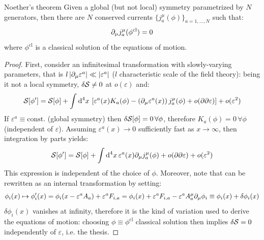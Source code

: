 \begin{theorem}{Noether's theorem}{}
  Given a global (but not local) symmetry parametrized by $ N $ generators, then there are $ N $ conserved currents $ \{j^\mu_a(\phi)\}_{a = 1, \dots, N} $ such that:
  \begin{equation}
    \partial_\mu j^\mu_a(\phi^\mathrm{cl}) = 0
  \end{equation}
  where $ \phi^\mathrm{cl} $ is a classical solution of the equations of motion.
\end{theorem}

\begin{proofbox}
  \begin{proof}
    First, consider an infinitesimal transformation with slowly-varying parameters, that is $ l \left\lvert\partial_\mu \varepsilon^a\right\rvert \ll \left\lvert\varepsilon^a\right\rvert $ ($ l $ characteristic scale of the field theory): being it not a local symmetry, $ \delta \mathcal{S} \neq 0 $ at $ o(\varepsilon) $ and:
    \begin{equation*}
      \mathcal{S}[\phi'] = \mathcal{S}[\phi] + \int \mathrm{d}^4 x\, \left[ \varepsilon^a(x) K_a(\phi) - \left( \partial_\mu \varepsilon^a(x) \right) j^\mu_a(\phi) + o(\partial \partial \varepsilon) \right] + o(\varepsilon^2)
    \end{equation*}
    If $ \varepsilon^a \equiv \mathrm{const.} $ (global symmetry) then $ \delta \mathcal{S}[\phi] = 0 \,\forall \phi $, therefore $ K_a(\phi) = 0 \,\forall \phi $ (independent of $ \varepsilon $). Assuming $ \varepsilon^a(x) \rightarrow 0 $ sufficiently fast as $ x \rightarrow \infty $, then integration by parts yields:
    \begin{equation*}
      \mathcal{S}[\phi'] = \mathcal{S}[\phi] + \int \mathrm{d}^4 x\, \varepsilon^a(x) \partial_\mu j^\mu_a(\phi) + o(\partial \partial \varepsilon) + o(\varepsilon^2)
    \end{equation*}
    This expression is independent of the choice of $ \phi $. Moreover, note that  can be rewritten as an internal transformation by setting:
    \begin{equation*}
      \phi_i(x) \mapsto \phi'_i(x) = \phi_i(x - \varepsilon^a A_a) + \varepsilon^a F_{i,a} = \phi_i(x) + \varepsilon^a F_{i,a} - \varepsilon^a A^\mu_a \partial_\mu \phi_i \equiv \phi_i(x) + \delta \phi_i(x)
    \end{equation*}
    $ \delta \phi_i(x) $ vanishes at infinity, therefore it is the kind of variation used to derive the equations of motion: choosing $ \phi \equiv \phi^\mathrm{cl} $ classical solution then implies $ \delta \mathcal{S} = 0 $ independently of $ \varepsilon $, i.e. the thesis.
  \end{proof}
\end{proofbox}

